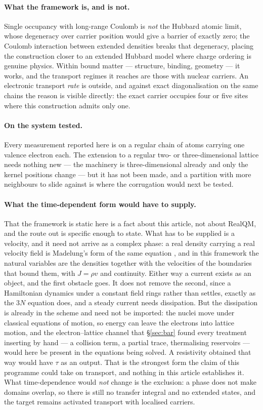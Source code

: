 \documentclass[11pt]{article}
\begin{document}
\paragraph{What the framework is, and is not.} Single occupancy with long-range Coulomb is
\emph{not} the Hubbard atomic limit, whose degeneracy over carrier position would give a barrier of
exactly zero; the Coulomb interaction between extended densities breaks that degeneracy, placing the
construction closer to an extended Hubbard model where charge ordering is genuine physics. Within
bound matter --- structure, binding, geometry --- it works, and the transport regimes it reaches are
those with nuclear carriers. An electronic transport \emph{rate} is outside, and against exact diagonalisation on
the same chains the reason is visible directly: the exact carrier occupies four or five sites where
this construction admits only one.

\paragraph{On the system tested.} Every measurement reported here is on a regular chain of atoms
carrying one valence electron each. The extension to a regular two- or three-dimensional lattice
needs nothing new --- the machinery is three-dimensional already and only the kernel positions
change --- but it has not been made, and a partition with more neighbours to slide against is where
the corrugation would next be tested.

\paragraph{What the time-dependent form would have to supply.} That the framework is static here is
a fact about this article, not about RealQM, and the route out is specific enough to state. What has
to be supplied is a velocity, and it need not arrive as a complex phase: a real density carrying a
real velocity field is Madelung's form of the same equation \cite{madelung}, and in this framework
the natural variables are the densities together with the velocities of the boundaries that bound
them, with $J=\rho v$ and continuity. Either way a current exists as an object, and the first
obstacle goes. It does not remove the second, since a Hamiltonian
dynamics under a constant field rings rather than settles, exactly as the $3N$ equation does, and a
steady current needs dissipation. But the dissipation is already in the scheme and need not be
imported: the nuclei move under classical equations of motion, so energy can leave the electrons
into lattice motion, and the electron--lattice channel that \S\ref{sec:bar} found every treatment
inserting by hand --- a collision term, a partial trace, thermalising reservoirs --- would here be
present in the equations being solved. A resistivity obtained that way would have $\tau$ as an
output. That is the strongest form the claim of this programme could take on transport, and nothing
in this article establishes it. What time-dependence would \emph{not} change is the exclusion:
a phase does not make domains overlap, so there is still no transfer integral and no extended
states, and the target remains activated transport with localised carriers.
\end{document}
